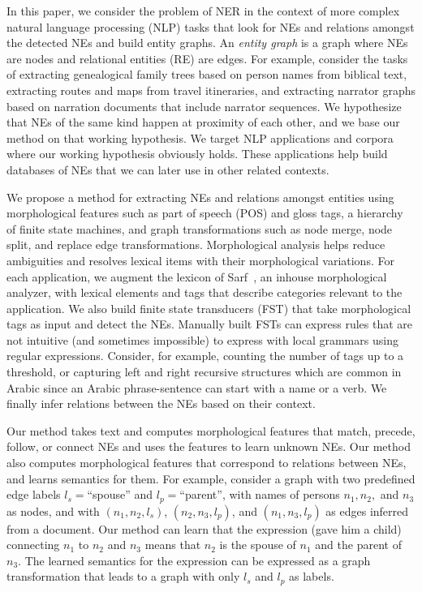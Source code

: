 \documentclass{llncs}
\newcommand{\utfRL}[1]{\setcode{utf8} \RL{#1} \setcode{standard}}
\begin{document}
In this paper, we consider the problem of NER
in the context of more complex natural language
processing (NLP) tasks that look for NEs and 
relations amongst the detected NEs and build entity graphs.
An {\em entity graph} is a graph where NEs are nodes and relational entities (RE) are edges.
For example, consider the tasks of 
extracting genealogical family trees based on person names 
from biblical text, 
extracting routes and maps from travel itineraries,
and 
extracting narrator graphs based on narration 
documents that include narrator sequences.
We hypothesize that NEs of the same kind happen 
at proximity of each other, and we base our method on that 
working hypothesis.
We target NLP applications and corpora where our working hypothesis
obviously holds.
These applications help build databases of NEs
that we can later use in other related contexts.

We propose a method for extracting NEs and 
relations amongst entities using 
morphological features such as part of speech (POS) and gloss tags, 
a hierarchy of finite state machines, 
and graph transformations such as node merge, node split, and replace edge transformations. 
Morphological analysis helps reduce ambiguities and resolves lexical items with their morphological variations.
For each application, we augment the lexicon of Sarf~\cite{ATMine09}, an inhouse morphological analyzer, 
with lexical elements and tags that describe categories relevant to the application. 
We also build finite state transducers (FST) that take 
morphological tags as input and detect the NEs.
Manually built FSTs can express rules that are not intuitive (and sometimes impossible) 
to express with local grammars using regular expressions.
Consider, for example, counting the number of tags up to a threshold, or capturing left and right recursive structures 
which are common in Arabic since an Arabic phrase-sentence can start with a name or a verb.
We finally infer relations between the NEs based on their context.

Our method takes text and computes morphological features that match, precede, follow, or connect NEs
and uses the features to learn unknown NEs.
Our method also computes morphological features that correspond to relations between NEs, and learns semantics
for them. 
For example, consider a graph with two predefined edge labels $l_s=$``spouse'' and $l_p=$``parent'', 
with names of persons $n_1, n_2,$ and $n_3$ as nodes,
and with $(n_1,n_2,l_s)$, $(n_2,n_3,l_p)$, and $(n_1,n_3,l_p)$ as edges inferred from a document.
Our method can learn that the expression \utfRL{ولدت له} (gave him a child) connecting 
$n_1$ to $n_2$ and $n_3$ means that $n_2$ is the spouse of $n_1$
and the parent of $n_3$.
The learned semantics for the expression can be expressed as a graph transformation that leads to a graph with only 
$l_s$ and $l_p$ as labels. 
\end{document}
